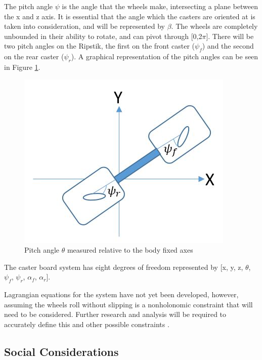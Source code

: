\par
The pitch angle $\psi$ is the angle that the wheels make, intersecting a plane between the x and z axis. It is essential that the angle which the casters are oriented at is taken into consideration, and will be represented by $\beta$. The wheels are completely unbounded in their ability to rotate, and can pivot through [0,2$\pi$]. There will be two pitch angles on the Ripstik, the first on the front caster ($\psi_f$) and the second on the rear caster ($\psi_r$). A graphical representation of the pitch angles can be seen in Figure \ref{fig:Pitch_angle}.
\begin{figure}[!htb]
\centering
\includegraphics[width=\linewidth]{Pitch_angle.JPG}
\caption{Pitch angle $\theta$ measured relative to the body fixed axes}\label{fig:Pitch_angle}
\endminipage
\end{figure}
\par

The caster board system has eight degrees of freedom represented by  [x, y, z, $\theta$, $\psi_{f}$, $\psi_{r}$, $\alpha_{f}$, $\alpha_{r}$].

Lagrangian equations for the system have not yet been developed, however, assuming the wheels roll without slipping is a nonholonomic constraint \cite{CasterboardRobot,BikeModel} that will need to be considered. Further research and analysis will be required to accurately define this and other possible constraints \cite{Lewis,BikeModel}.

\subsection{Social Considerations}
